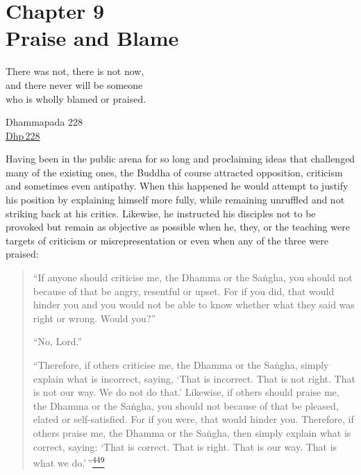 \label{footprints_split_012.html_calibre_pb_25}

\label{footprints_split_013.html}{}

\section{\texorpdfstring{{Chapter 9}\\
Praise and
Blame}{Chapter 9 Praise and Blame}}\label{footprints_split_013.html_TOCTarget9}

There was not, there is not now,\\
and there never will be someone\\
who is wholly blamed or praised.

Dhammapada 228\\
\href{https://suttacentral.net/dhp228/en/sujato}{Dhp\,228}

Having been in the public arena for so long and proclaiming ideas that
challenged many of the existing ones, the Buddha of course attracted
opposition, criticism and sometimes even antipathy. When this happened
he would attempt to justify his position by explaining himself more
fully, while remaining unruffled and not striking back at his critics.
Likewise, he instructed his disciples not to be provoked but remain as
objective as possible when he, they, or the teaching were targets of
criticism or misrepresentation or even when any of the three were
praised:

\begin{quote}
``If anyone should criticise me, the Dhamma or the Saṅgha, you should
not because of that be angry, resentful or upset. For if you did, that
would hinder you and you would not be able to know whether what they
said was right or wrong. Would you?''

``No, Lord.''

``Therefore, if others criticise me, the Dhamma or the Saṅgha, simply
explain what is incorrect, saying, `That is incorrect. That is not
right. That is not our way. We do not do that.' Likewise, if others
should praise me, the Dhamma or the Saṅgha, you should not because of
that be pleased, elated or self-satisfied. For if you were, that would
hinder you. Therefore, if others praise me, the Dhamma or the Saṅgha,
then simply explain what is correct, saying: `That is correct. That is
right. That is our way. That is what we
do.'\,''\label{footprints_split_013.html_fnref449}\hyperref[footprints_split_025.htmlux5cux23fn449]{\textsuperscript{449}}
\end{quote}

